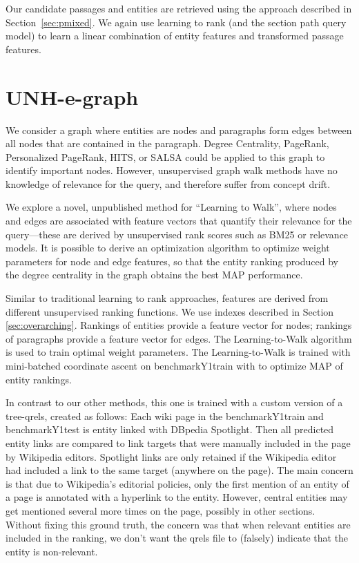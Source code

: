 \documentclass{article}
\begin{document}
Our candidate passages and entities are retrieved using the approach described in Section~\ref{sec:pmixed}. We again use learning to rank (and the section path query model) to learn a linear combination of entity features and transformed passage features.



\section{UNH-e-graph}

We consider a graph where entities are nodes and paragraphs form edges between all nodes that are contained in the paragraph. Degree Centrality, PageRank, Personalized PageRank, HITS, or SALSA could be applied to this graph to identify important nodes. However, unsupervised graph walk methods have no knowledge of relevance for the query, and therefore suffer from concept drift. 

We explore a novel, unpublished method for ``Learning to Walk'', where nodes and edges are associated with feature vectors that quantify their relevance for the query---these are derived by unsupervised rank scores such as BM25 or relevance models. It is possible to derive an optimization algorithm to optimize weight parameters for node and edge features, so that the entity ranking produced by the degree centrality in the graph obtains the best MAP performance.

Similar to traditional learning to rank approaches, features are derived from different unsupervised ranking functions. 
We use indexes described in Section \ref{sec:overarching}. Rankings of entities provide a feature vector for nodes; rankings of paragraphs provide a feature vector for edges.  The Learning-to-Walk algorithm is used to train optimal weight parameters. The Learning-to-Walk is trained with mini-batched coordinate ascent on benchmarkY1train with to optimize MAP of entity rankings.

In contrast to our other methods, this one is trained with a custom version of a tree-qrels, created as follows: Each wiki page in the benchmarkY1train and benchmarkY1test is entity linked with DBpedia Spotlight. Then all predicted entity links are compared to link targets that were manually included in the page by Wikipedia editors. Spotlight links are only retained if the Wikipedia editor had included a link to the same target (anywhere on the page).  The main concern is that due to Wikipedia's editorial policies, only the first mention of an entity of a page is annotated with a hyperlink to the entity. However, central entities may get mentioned several more times on the page, possibly in other sections. Without fixing this ground truth, the concern was that when relevant entities are included in the ranking, we don't want the qrels file to (falsely) indicate that the entity is non-relevant.
\end{document}
